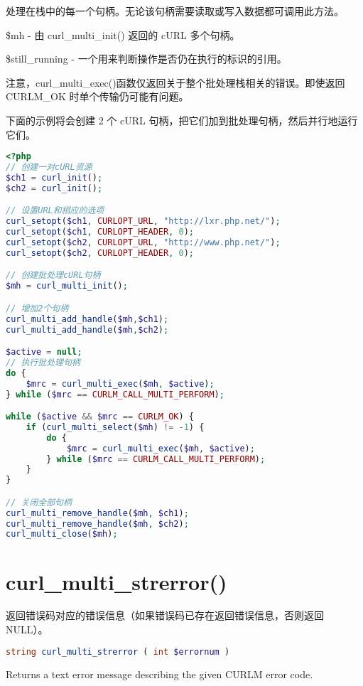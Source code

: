 处理在栈中的每一个句柄。无论该句柄需要读取或写入数据都可调用此方法。

\begin{compactitem}
\item \$mh - 由 curl\_multi\_init() 返回的 cURL 多个句柄。
\item \$still\_running - 一个用来判断操作是否仍在执行的标识的引用。
\end{compactitem}

注意，curl\_multi\_exec()函数仅返回关于整个批处理栈相关的错误。即使返回 CURLM\_OK 时单个传输仍可能有问题。

下面的示例将会创建 2 个 cURL 句柄，把它们加到批处理句柄，然后并行地运行它们。

\begin{lstlisting}[language=PHP]
<?php
// 创建一对cURL资源
$ch1 = curl_init();
$ch2 = curl_init();

// 设置URL和相应的选项
curl_setopt($ch1, CURLOPT_URL, "http://lxr.php.net/");
curl_setopt($ch1, CURLOPT_HEADER, 0);
curl_setopt($ch2, CURLOPT_URL, "http://www.php.net/");
curl_setopt($ch2, CURLOPT_HEADER, 0);

// 创建批处理cURL句柄
$mh = curl_multi_init();

// 增加2个句柄
curl_multi_add_handle($mh,$ch1);
curl_multi_add_handle($mh,$ch2);

$active = null;
// 执行批处理句柄
do {
    $mrc = curl_multi_exec($mh, $active);
} while ($mrc == CURLM_CALL_MULTI_PERFORM);

while ($active && $mrc == CURLM_OK) {
    if (curl_multi_select($mh) != -1) {
        do {
            $mrc = curl_multi_exec($mh, $active);
        } while ($mrc == CURLM_CALL_MULTI_PERFORM);
    }
}

// 关闭全部句柄
curl_multi_remove_handle($mh, $ch1);
curl_multi_remove_handle($mh, $ch2);
curl_multi_close($mh);
\end{lstlisting}

\section{curl\_multi\_strerror()}

返回错误码对应的错误信息（如果错误码已存在返回错误信息，否则返回NULL）。


\begin{lstlisting}[language=PHP]
string curl_multi_strerror ( int $errornum )
\end{lstlisting}

Returns a text error message describing the given CURLM error code.

